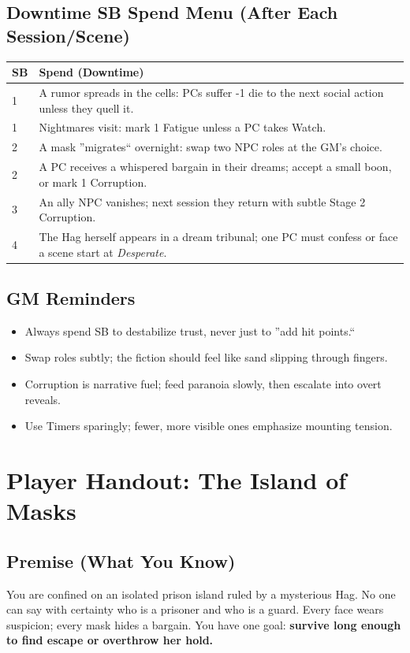 \documentclass[11pt]{article}
\begin{document}
\subsection{Downtime SB Spend Menu (After Each Session/Scene)}
\begin{longtable}{@{}p{1.5cm}p{13.2cm}@{}}
\toprule
\textbf{SB} & \textbf{Spend (Downtime)} \\
\midrule
1 & A rumor spreads in the cells: PCs suffer -1 die to the next social action unless they quell it. \\
1 & Nightmares visit: mark 1 Fatigue unless a PC takes Watch. \\
2 & A mask ''migrates`` overnight: swap two NPC roles at the GM's choice. \\
2 & A PC receives a whispered bargain in their dreams; accept a small boon, or mark 1 Corruption. \\
3 & An ally NPC vanishes; next session they return with subtle Stage 2 Corruption. \\
4 & The Hag herself appears in a dream tribunal; one PC must confess or face a scene start at \emph{Desperate}. \\
\bottomrule
\end{longtable}

\subsection{GM Reminders}
\begin{itemize}
  \item Always spend SB to destabilize trust, never just to ''add hit points.``  
  \item Swap roles subtly; the fiction should feel like sand slipping through fingers.  
  \item Corruption is narrative fuel; feed paranoia slowly, then escalate into overt reveals.  
  \item Use Timers sparingly; fewer, more visible ones emphasize mounting tension.  
\end{itemize}

\section{Player Handout: The Island of Masks}

\subsection{Premise (What You Know)}
You are confined on an isolated prison island ruled by a mysterious Hag.  
No one can say with certainty who is a prisoner and who is a guard.  
Every face wears suspicion; every mask hides a bargain.  
You have one goal: \textbf{survive long enough to find escape or overthrow her hold.}
\end{document}
